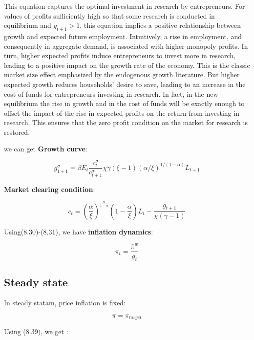 \documentclass[10pt,math=newtx,citestyle=gb7714-2015,bibstyle=gb7714-2015]{elegantbook}
\begin{document}
{{{This equation captures the optimal investment in research by entrepreneurs. For values of profits sufficiently high so that some research is conducted in equilibrium and $g_{t+1}>1$, this equation implies a positive relationship between growth and expected future employment. Intuitively, a rise in employment, and consequently in aggregate demand, is associated with higher monopoly profits. In turn, higher expected profits induce entrepreneurs to invest more in research, leading to a positive impact on the growth rate of the economy. This is the classic market size effect emphasized by the endogenous growth literature. But higher expected growth reduces households’ desire to save, leading to an increase in the cost of funds for entrepreneurs investing in research. In fact, in the new equilibrium the rise in growth and in the cost of funds will be exactly enough to offset the impact of the rise in expected profits on the return from investing in research. This ensures that the zero profit condition on the market for research is restored.

we can get \textbf{Growth curve}:

\begin{equation}
g_{1+1}^{\sigma} = \beta E_t \frac{c_t^\sigma}{c_{t+1}^\sigma}\chi \gamma (\xi-1)(\alpha / \xi)^{1 /(1-\alpha)} L_{t+1}
\end{equation}

\textbf{Market clearing condition}:

\begin{equation}
	c_t =  \left(\frac{\alpha}{\xi}\right)^{\frac{\alpha}{1-\alpha}}\left(1-\frac{\alpha}{\xi}\right)L_t-\frac{g_{t+1}}{\chi(\gamma-1)}
\end{equation}

Using(8.30)-(8.31), we have \textbf{inflation dynamics}:

\begin{equation}
	\pi_t = \frac{\bar{\pi}^w}{g_t} 
\end{equation}

\subsection{Steady state}

In steady statam, price inflation is fixed:

\begin{equation}
	\pi = \pi_{target}
\end{equation}
 
 Using (8.39), we get :
 
}}}
\end{document}
